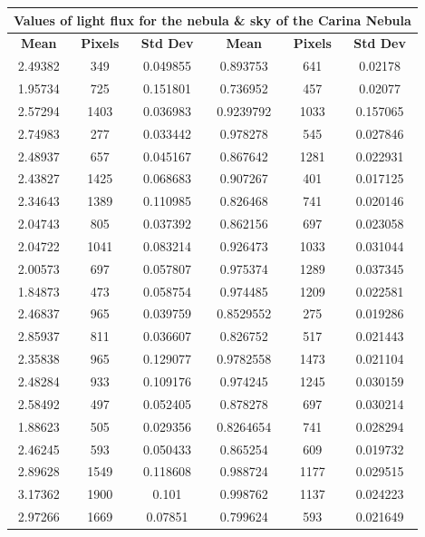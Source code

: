 \documentclass[12pt]{article}
\begin{document}
\begin{table}[H]
\begin{center}
 \footnotesize
 \begin{tabular}{|c|c|c||c|c|c|}
 \hline
 \multicolumn{6}{|c|}{Values of light flux for the nebula \& sky of the Carina Nebula} \\
 \hline
 \textbf{Mean} & \textbf{Pixels} & \textbf{Std Dev} & \textbf{Mean} & \textbf{Pixels} & \textbf{Std Dev}\\
 \hline \hline
 2.49382 & 349 & 0.049855	 & 0.893753 & 641 & 0.02178 \\
 \hline
 1.95734 & 725 & 0.151801	& 0.736952 & 457 & 0.02077 \\
 \hline
 2.57294 & 1403 & 0.036983 & 0.9239792 & 1033 & 0.157065 \\
 \hline
 2.74983 & 277 & 0.033442	 & 0.978278 & 545 & 0.027846 \\
 \hline
 2.48937	& 657 & 0.045167	&	0.867642&	1281	&0.022931 \\
 \hline
 2.43827	&1425	& 0.068683&		0.907267&	401&	0.017125\\
 \hline
 2.34643	&1389	&0.110985	&	0.826468&	741	&0.020146\\
 \hline
 2.04743&	805&	0.037392	&	0.862156&	697&	0.023058\\
 \hline
 2.04722&	1041&	0.083214	&	0.926473&	1033&	0.031044\\
 \hline
2.00573&	697	&0.057807	&	0.975374&	1289&	0.037345\\
 \hline
 1.84873&	473&	0.058754	&	0.974485&	1209&	0.022581\\
 \hline
 2.46837&	965&	0.039759	&	0.8529552&	275&	0.019286\\
 \hline
 2.85937&	811	&0.036607	&	0.826752&	517&	0.021443\\
 \hline
 2.35838&	965	&0.129077	&	0.9782558&	1473&	0.021104\\
 \hline
 2.48284&	933	&0.109176	&	0.974245&	1245&	0.030159\\
 \hline
 2.58492&	497	&0.052405	&	0.878278&	697&	0.030214\\
 \hline
 1.88623&	505	&0.029356	&	0.8264654&	741&	0.028294\\
 \hline
 2.46245&	593	&0.050433	&	0.865254&	609&	0.019732\\
 \hline
 2.89628&	1549	&0.118608	&	0.988724&	1177&	0.029515\\
 \hline
 3.17362&	1900	&0.101	&	0.998762&	1137&	0.024223\\
 \hline
 2.97266&	1669	&0.07851	&	0.799624&	593&	0.021649\\

\end{tabular}
\end{center}
\end{table}
\end{document}
